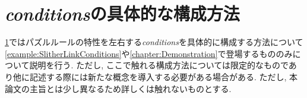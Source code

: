 

\section{{\it conditions}の具体的な構成方法}\label{section:ConcreteConditions}
\cref{section:ConcreteConditions}ではパズルルールの特性を左右する\textit{conditions}を具体的に構成する方法について\cref{example:SlitherLinkConditions}や\cref{chapter:Demonstration}で登場するもののみについて説明を行う. ただし, ここで触れる構成方法については限定的なものであり他に記述する際には新たな概念を導入する必要がある場合がある. ただし, 本論文の主旨とは少し異なるため詳しくは触れないものとする.
